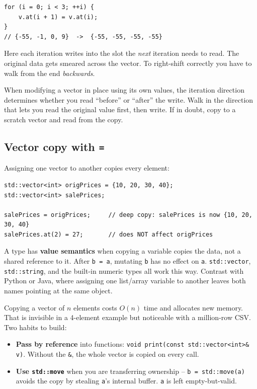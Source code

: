 \documentclass[11pt]{article}
\begin{document}
\begin{examplebox}
\begin{lstlisting}
for (i = 0; i < 3; ++i) {
    v.at(i + 1) = v.at(i);
}
// {-55, -1, 0, 9}  ->  {-55, -55, -55, -55}
\end{lstlisting}
Here each iteration writes into the slot the \emph{next} iteration
needs to read. The original data gets smeared across the vector. To
right-shift correctly you have to walk from the end \emph{backwards}.
\end{examplebox}

\begin{ideabox}
When modifying a vector in place using its own values, the iteration
direction determines whether you read ``before'' or ``after'' the
write. Walk in the direction that lets you read the original value
first, then write. If in doubt, copy to a scratch vector and read
from the copy.
\end{ideabox}

\subsection{Vector copy with \texttt{=}}

Assigning one vector to another copies every element:

\begin{lstlisting}
std::vector<int> origPrices = {10, 20, 30, 40};
std::vector<int> salePrices;

salePrices = origPrices;     // deep copy: salePrices is now {10, 20, 30, 40}
salePrices.at(2) = 27;       // does NOT affect origPrices
\end{lstlisting}

\begin{defnbox}
A type has \textbf{value semantics} when copying a variable copies
the data, not a shared reference to it. After \texttt{b = a}, mutating
\texttt{b} has no effect on \texttt{a}. \texttt{std::vector},
\texttt{std::string}, and the built-in numeric types all work this way.
Contrast with Python or Java, where assigning one list/array variable
to another leaves both names pointing at the same object.
\end{defnbox}

\begin{ideabox}
Copying a vector of $n$ elements costs $O(n)$ time and allocates new
memory. That is invisible in a 4-element example but noticeable with
a million-row CSV. Two habits to build:
\begin{itemize}
    \item \textbf{Pass by reference} into functions:
          \texttt{void print(const std::vector<int>\& v)}. Without the
          \texttt{\&}, the whole vector is copied on every call.
    \item \textbf{Use \texttt{std::move}} when you are transferring
          ownership -- \texttt{b = std::move(a)} avoids the copy by
          stealing \texttt{a}'s internal buffer. \texttt{a} is left
          empty-but-valid.
\end{itemize}
\end{ideabox}
\end{document}
